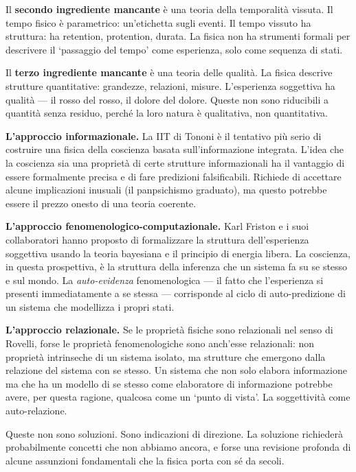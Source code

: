 \documentclass[12pt,a4paper,openany]{book}
\newcommand{\sezione}[1]{\vspace{1.2em}{\large\bfseries #1}\vspace{0.5em}\par}
\begin{document}
Il \textbf{secondo ingrediente mancante} è una teoria della temporalità vissuta. Il tempo fisico è parametrico: un'etichetta sugli eventi. Il tempo vissuto ha struttura: ha retention, protention, durata. La fisica non ha strumenti formali per descrivere il `passaggio del tempo' come esperienza, solo come sequenza di stati.

Il \textbf{terzo ingrediente mancante} è una teoria delle qualità. La fisica descrive strutture quantitative: grandezze, relazioni, misure. L'esperienza soggettiva ha qualità --- il rosso del rosso, il dolore del dolore. Queste non sono riducibili a quantità senza residuo, perché la loro natura è qualitativa, non quantitativa.

\sezione{Alcune direzioni promettenti}

\textbf{L'approccio informazionale.} La IIT di Tononi è il tentativo più serio di costruire una fisica della coscienza basata sull'informazione integrata. L'idea che la coscienza sia una proprietà di certe strutture informazionali ha il vantaggio di essere formalmente precisa e di fare predizioni falsificabili. Richiede di accettare alcune implicazioni inusuali (il panpsichismo graduato), ma questo potrebbe essere il prezzo onesto di una teoria coerente.

\textbf{L'approccio fenomenologico-computazionale.} Karl Friston e i suoi collaboratori hanno proposto di formalizzare la struttura dell'esperienza soggettiva usando la teoria bayesiana e il principio di energia libera. La coscienza, in questa prospettiva, è la struttura della inferenza che un sistema fa su se stesso e sul mondo. La \textit{auto-evidenza} fenomenologica --- il fatto che l'esperienza si presenti immediatamente a se stessa --- corrisponde al ciclo di auto-predizione di un sistema che modellizza i propri stati.

\textbf{L'approccio relazionale.} Se le proprietà fisiche sono relazionali nel senso di Rovelli, forse le proprietà fenomenologiche sono anch'esse relazionali: non proprietà intrinseche di un sistema isolato, ma strutture che emergono dalla relazione del sistema con se stesso. Un sistema che non solo elabora informazione ma che ha un modello di se stesso come elaboratore di informazione potrebbe avere, per questa ragione, qualcosa come un `punto di vista'. La soggettività come auto-relazione.

Queste non sono soluzioni. Sono indicazioni di direzione. La soluzione richiederà probabilmente concetti che non abbiamo ancora, e forse una revisione profonda di alcune assunzioni fondamentali che la fisica porta con sé da secoli.
\end{document}
